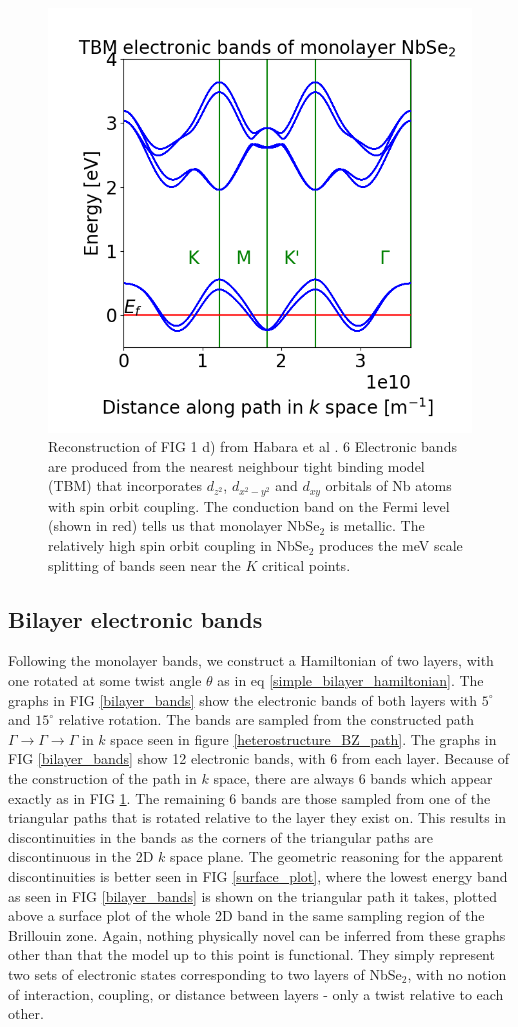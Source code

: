 \documentclass[12pt]{report} %
\begin{document}
\begin{figure}[t!]
\centering
  \includegraphics[width=0.6\columnwidth]{monolayer_bands.png}
  \caption{
    Reconstruction of FIG 1 d) from Habara et al \cite{Habara2021}. 6 Electronic bands are produced from the nearest neighbour tight binding model (TBM) that incorporates $d_{z^2}$, $d_{x^2 - y^2}$ and $d_{xy}$ orbitals of Nb atoms with spin orbit coupling. The conduction band on the Fermi level (shown in red) tells us that monolayer NbSe$_2$ is metallic. The relatively high spin orbit coupling in NbSe$_2$ produces the meV scale splitting of bands seen near the $K$ critical points.
  }
  \label{monolayer_bands}
\end{figure}

\subsection*{Bilayer electronic bands}
Following the monolayer bands, we construct a Hamiltonian of two layers, with one rotated at some twist angle $\theta$ as in eq \ref{simple_bilayer_hamiltonian}. The graphs in FIG \ref{bilayer_bands} show the electronic bands of both layers with $5^\circ$ and $15^\circ$ relative rotation. The bands are sampled from the constructed path $\Gamma \rightarrow \Gamma \rightarrow \Gamma$ in $k$ space seen in figure \ref{heterostructure_BZ_path}. The graphs in FIG \ref{bilayer_bands} show 12 electronic bands, with 6 from each layer. Because of the construction of the path in $k$ space, there are always 6 bands which appear exactly as in FIG \ref{monolayer_bands}. The remaining 6 bands are those sampled from one of the triangular paths that is rotated relative to the layer they exist on. This results in discontinuities in the bands as the corners of the triangular paths are discontinuous in the 2D $k$ space plane. The geometric reasoning for the apparent discontinuities is better seen in FIG \ref{surface_plot}, where the lowest energy band as seen in FIG \ref{bilayer_bands} is shown on the triangular path it takes, plotted above a surface plot of the whole 2D band in the same sampling region of the Brillouin zone. Again, nothing physically novel can be inferred from these graphs other than that the model up to this point is functional. They simply represent two sets of electronic states corresponding to two layers of NbSe$_2$, with no notion of interaction, coupling, or distance between layers - only a twist relative to each other. 
\end{document}
